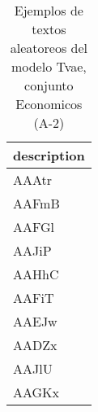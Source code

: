 \begin{table}[H]
\centering
\fontsize{8}{14}\selectfont
\caption{Ejemplos de textos aleatoreos del modelo Tvae, conjunto Economicos (A-2)}
\label{table-sample10-economicos-a-2-tvae-text}
\begin{tabular}{|m{50em}|}
\hline
\rowcolor[gray]{0.8}
description \\
\hline AAAtr \\
\hline AAFmB \\
\hline AAFGl \\
\hline AAJiP \\
\hline AAHhC \\
\hline AAFiT \\
\hline AAEJw \\
\hline AADZx \\
\hline AAJlU \\
\hline AAGKx \\
\hline
\end{tabular}
\end{table}
